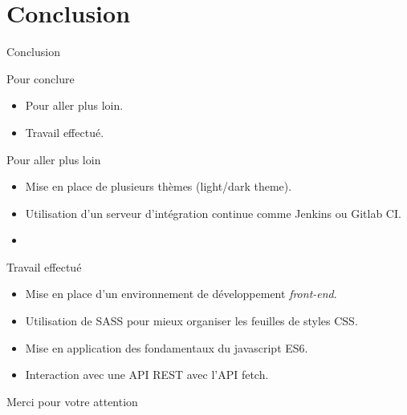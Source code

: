 \section{Conclusion}

\begin{frame}{Conclusion}
  \begin{block}{Pour conclure}
    \begin{itemize}
    \item Pour aller plus loin.
    \item Travail effectué.
    \end{itemize}
  \end{block}
\end{frame}

\begin{frame}{Pour aller plus loin}
  \begin{block}{}
    \begin{itemize}
    \item Mise en place de plusieurs thèmes (light/dark theme).
    \item Utilisation d'un serveur d'intégration continue comme
      Jenkins ou Gitlab CI.
    \item 
    \end{itemize}
  \end{block}
\end{frame}

\begin{frame}{Travail effectué}
  \begin{block}{}
    \begin{itemize}
    \item Mise en place d'un environnement de développement \textit{front-end}.
    \item Utilisation de SASS pour mieux organiser les feuilles de styles CSS.
    \item Mise en application des fondamentaux du javascript ES6.
    \item Interaction avec une API REST avec l'API fetch.
    \end{itemize}
  \end{block}
\end{frame}

\begin{frame}{Merci pour votre attention}
  \tableofcontents
\end{frame}
